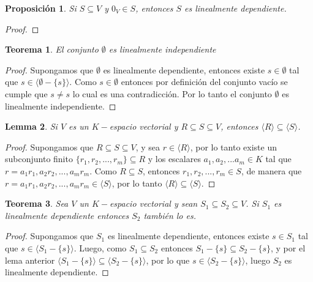 \documentclass{book}
\newtheorem{theorem}{Teorema}
\newtheorem{proposition}{Proposición}
\newtheorem{lemma}[theorem]{Lemma}
\begin{document}
\begin{proposition}
Si $S \subseteq V$ y $0_V \in S$, entonces $S$ es linealmente dependiente.
\end{proposition}

\begin{proof}

\end{proof}

\begin{theorem}
El conjunto $\emptyset$ es linealmente independiente
\end{theorem}

\begin{proof}
Supongamos que $\emptyset$ es linealmente dependiente, entonces existe $s \in \emptyset$ tal que $s \in \langle \emptyset-\{s\} \rangle$. Como $s \in \emptyset$ entonces por definición del conjunto vacío se cumple que $s\neq s$ lo cual es una contradicción. Por lo tanto el conjunto $\emptyset$ es linealmente independiente.
\end{proof}

\begin{lemma}
Si $V$ es un $K-$espacio vectorial y $R\subseteq S\subseteq V$, entonces $\langle R \rangle \subseteq \langle S \rangle$.
\end{lemma}

\begin{proof}
Supongamos que $R\subseteq S\subseteq V$, y sea $r \in \langle R \rangle$, por lo tanto existe un subconjunto finito $\{r_1,r_2,...,r_m \} \subseteq R$ y los escalares $a_1,a_2,...a_m \in K$ tal que $r=a_1r_1,a_2r_2,...,a_mr_m$. Como $R\subseteq S$, entonces $r_1,r_2,...,r_m \in S$, de manera que $r=a_1r_1,a_2r_2,...,a_mr_m \in \langle S \rangle$, por lo tanto $\langle R \rangle \subseteq \langle S \rangle$.

\end{proof}

\begin{theorem}
Sea $V$ un $K-$espacio vectorial y sean $S_1\subseteq S_2\subseteq V$. Si $S_1$ es linealmente dependiente entonces $S_2$ también lo es.
\end{theorem}

\begin{proof}
Supongamos que $S_1$ es linealmente dependiente, entonces existe $s \in S_1$ tal que $s \in \langle S_1-\{s\} \rangle$. Luego, como $S_1\subseteq S_2$ entonces $S_1-\{s\} \subseteq S_2-\{s \}$, y por el lema anterior $\langle S_1-\{s \} \rangle \subseteq \langle S_2-\{s \} \rangle$, por lo que $s \in \langle S_2-\{s\} \rangle$, luego $S_2$ es linealmente dependiente.
\end{proof}
\end{document}
